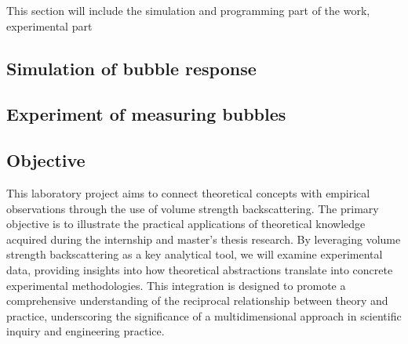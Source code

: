 This section will include the simulation and programming part of the work, experimental part

\subsection{Simulation of bubble response}

\subsection{Experiment of measuring bubbles}






\subsection{Objective}

This laboratory project aims to connect theoretical concepts with empirical observations through the use of volume strength backscattering. The primary objective is to illustrate the practical applications of theoretical knowledge acquired during the internship and master’s thesis research. By leveraging volume strength backscattering as a key analytical tool, we will examine experimental data, providing insights into how theoretical abstractions translate into concrete experimental methodologies. This integration is designed to promote a comprehensive understanding of the reciprocal relationship between theory and practice, underscoring the significance of a multidimensional approach in scientific inquiry and engineering practice.

